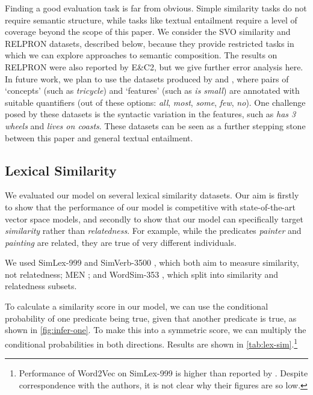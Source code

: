 \documentclass[a4paper,11pt]{article}
\begin{document}
Finding a good evaluation task is far from obvious.
Simple similarity tasks do not require semantic structure,
while tasks like textual entailment
require a level of coverage beyond the scope of this paper.
We consider the SVO similarity and RELPRON datasets, described below,
because they provide restricted tasks in which we can explore approaches to semantic composition.
The results on RELPRON were also reported by E\&C2,
but we give further error analysis here.
In future work, we plan to use the datasets produced by
\citet{herbelot2016quantifier} and \citet{herbelot2013quantifier},
where pairs of `concepts' (such as \textit{tricycle}) and `features' (such as \textit{is small})
are annotated with suitable quantifiers
(out of these options: \textit{all}, \textit{most}, \textit{some}, \textit{few}, \textit{no}).
One challenge posed by these datasets is
the syntactic variation in the features,
such as \textit{has 3 wheels} and \textit{lives on coasts}.
These datasets can be seen as a further stepping stone
between this paper and general textual entailment.


\pagebreak


\subsection{Lexical Similarity}
\label{sec:lex-sim}

We evaluated our model on several lexical similarity datasets.
Our aim is firstly to show that the performance of our model
is competitive with state-of-the-art vector space models,
and secondly to show that our model can specifically target \textit{similarity} rather than \textit{relatedness}.
For example, while the predicates \textit{painter} and \textit{painting} are related,
they are true of very different individuals.

We used
SimLex-999 \citep{hill2015simlex} and SimVerb-3500 \citep{gerz2016simverb},
which both aim to measure similarity, not relatedness;
MEN \citep{bruni2014men}; and
WordSim-353 \citep{finkelstein2001wordsim}, 
which \citet{agirre2009wordsim} split into similarity and relatedness subsets.

To calculate a similarity score in our model,
we can use the conditional probability of one predicate being true,
given that another predicate is true,
as shown in \cref{fig:infer-one}.
To make this into a symmetric score,
we can multiply the conditional probabilities in both directions.
Results are shown in \cref{tab:lex-sim}.\footnote{%
  Performance of Word2Vec on SimLex-999 is higher than reported by \citet{hill2015simlex}.
  Despite correspondence with the authors,
  it is not clear why their figures are so low.
}
\end{document}
